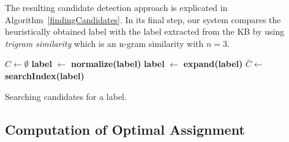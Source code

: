 The resulting candidate detection approach is explicated in Algorithm~\ref{findingCandidates}.
In its final step, our system compares the heuristically obtained label with the label extracted from the \ac{KB} by using \emph{trigram similarity} which is an n-gram similarity with $n=3$. 

\begin{algorithm}[t!]
$C \longleftarrow \emptyset$\;
{\bf label } $\longleftarrow$ {\bf normalize(label)}\;
{\bf label } $\longleftarrow$ {\bf expand(label)}\;
$ \displaystyle \bar C \longleftarrow$ {\bf searchIndex(label)}\;
\For{{\bf c} $\in \bar C$}{
    \If{$\neg${\bf c .matches([0-9]$^+$)}}{
        \If{{\bf trigramSimilarity(c, label)}$ \geq \sigma$}{
            \If{{\bf fitDomain(c)}} {
                $C \longleftarrow C \cup $ {\bf c}\;
            }
        }
    }
}
\caption{Searching candidates for a label.}
\label{findingCandidates}
\end{algorithm}

\subsection{Computation of Optimal Assignment}

